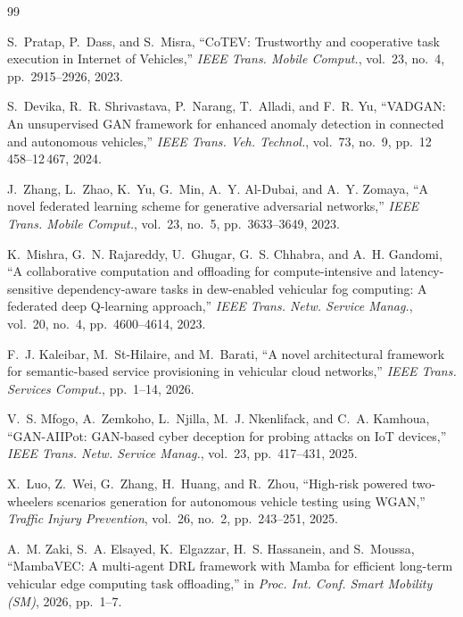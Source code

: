 \documentclass[journal]{IEEEtran}
\begin{document}
\begin{thebibliography}{99}

S.~Pratap, P.~Dass, and S.~Misra, ``CoTEV: Trustworthy and cooperative task
execution in Internet of Vehicles,'' \emph{IEEE Trans. Mobile Comput.},
vol.~23, no.~4, pp.~2915--2926, 2023.

S.~Devika, R.~R. Shrivastava, P.~Narang, T.~Alladi, and F.~R. Yu, ``VADGAN: An
unsupervised GAN framework for enhanced anomaly detection in connected and
autonomous vehicles,'' \emph{IEEE Trans. Veh. Technol.}, vol.~73, no.~9,
pp.~12\,458--12\,467, 2024.

J.~Zhang, L.~Zhao, K.~Yu, G.~Min, A.~Y. Al-Dubai, and A.~Y. Zomaya, ``A novel
federated learning scheme for generative adversarial networks,'' \emph{IEEE
Trans. Mobile Comput.}, vol.~23, no.~5, pp.~3633--3649, 2023.

K.~Mishra, G.~N. Rajareddy, U.~Ghugar, G.~S. Chhabra, and A.~H. Gandomi, ``A
collaborative computation and offloading for compute-intensive and
latency-sensitive dependency-aware tasks in dew-enabled vehicular fog
computing: A federated deep Q-learning approach,'' \emph{IEEE Trans. Netw.
Service Manag.}, vol.~20, no.~4, pp.~4600--4614, 2023.

F.~J. Kaleibar, M.~St-Hilaire, and M.~Barati, ``A novel architectural framework
for semantic-based service provisioning in vehicular cloud networks,''
\emph{IEEE Trans. Services Comput.}, pp.~1--14, 2026.

V.~S. Mfogo, A.~Zemkoho, L.~Njilla, M.~J. Nkenlifack, and C.~A. Kamhoua,
``GAN-AIIPot: GAN-based cyber deception for probing attacks on IoT devices,''
\emph{IEEE Trans. Netw. Service Manag.}, vol.~23, pp.~417--431, 2025.

X.~Luo, Z.~Wei, G.~Zhang, H.~Huang, and R.~Zhou, ``High-risk powered
two-wheelers scenarios generation for autonomous vehicle testing using WGAN,''
\emph{Traffic Injury Prevention}, vol.~26, no.~2, pp.~243--251, 2025.

A.~M. Zaki, S.~A. Elsayed, K.~Elgazzar, H.~S. Hassanein, and S.~Moussa,
``MambaVEC: A multi-agent DRL framework with Mamba for efficient long-term
vehicular edge computing task offloading,'' in \emph{Proc. Int. Conf. Smart
Mobility (SM)}, 2026, pp.~1--7.


\end{thebibliography}
\end{document}
